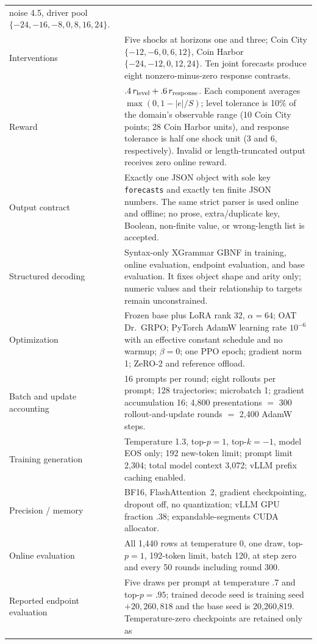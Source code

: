 \begin{center}
\begin{minipage}{\linewidth}
\begin{tabular}{p{.29\linewidth}p{.66\linewidth}}
noise 4.5, driver pool $\{-24,-16,-8,0,8,16,24\}$. \\
Interventions & Five shocks at horizons one and three; Coin City
$\{-12,-6,0,6,12\}$, Coin Harbor $\{-24,-12,0,12,24\}$. Ten joint forecasts
produce eight nonzero-minus-zero response contrasts. \\
Reward & $.4\,r_{\rm level}+.6\,r_{\rm response}$. Each component averages
$\max(0,1-|e|/S)$; level tolerance is 10\% of the domain's observable range
(10 Coin City points; 28 Coin Harbor units), and response tolerance is half one
shock unit (3 and 6, respectively). Invalid or length-truncated output receives
zero online reward. \\
Output contract & Exactly one JSON object with sole key
\texttt{forecasts} and exactly ten finite JSON numbers. The same strict parser
is used online and offline; no prose, extra/duplicate key, Boolean, non-finite
value, or wrong-length list is accepted. \\
Structured decoding & Syntax-only XGrammar GBNF in training, online evaluation,
endpoint evaluation, and base evaluation. It fixes object shape and arity only;
numeric values and their relationship to targets remain unconstrained. \\
Optimization & Frozen base plus LoRA rank 32, $\alpha=64$; OAT Dr.~GRPO;
PyTorch AdamW learning rate $10^{-6}$ with an effective constant schedule and no
warmup; $\beta=0$; one PPO epoch; gradient norm 1; ZeRO-2 and reference offload. \\
Batch and update accounting & 16 prompts per round; eight rollouts per prompt;
128 trajectories; microbatch 1; gradient accumulation 16; 4,800 presentations
$=$ 300 rollout-and-update rounds $=$ 2,400 AdamW steps. \\
Training generation & Temperature 1.3, top-$p=1$, top-$k=-1$, model EOS only;
192 new-token limit; prompt limit 2,304; total model context 3,072; vLLM prefix
caching enabled. \\
Precision / memory & BF16, FlashAttention~2, gradient checkpointing, dropout
off, no quantization; vLLM GPU fraction .38; expandable-segments CUDA allocator. \\
Online evaluation & All 1,440 rows at temperature 0, one draw, top-$p=1$,
192-token limit, batch 120, at step zero and every 50 rounds including round 300. \\
Reported endpoint evaluation & Five draws per prompt at temperature .7 and
top-$p=.95$; trained decode seed is training seed $+20{,}260{,}818$ and the
base seed is 20,260,819. Temperature-zero checkpoints are retained only as

\end{tabular}
\end{minipage}
\end{center}
